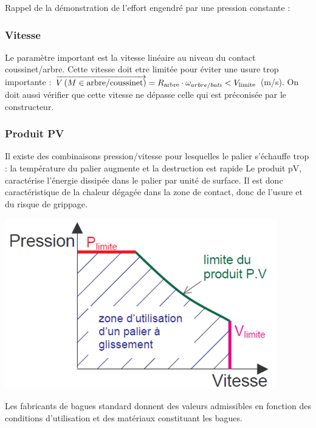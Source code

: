 \documentclass[11pt,oneside]{article}
\begin{document}
\begin{exemple}
Rappel de la démonstration de l'effort engendré par une pression constante :

\end{exemple}
\subsubsection{Vitesse}

Le paramètre important est la vitesse linéaire au niveau du contact coussinet/arbre. Cette vitesse doit etre limitée pour éviter une usure trop importante : $\overrightarrow{V\left( {M} \in {\text{arbre}}/{\text{coussinet}}\right)}  =R_{\text{arbre}}\cdot  \omega_{arbre/bati}<V_{\text{limite}}$ (m/s).
On doit aussi vérifier que cette vitesse ne dépasse celle qui est préconisée par le constructeur.

\subsubsection{Produit PV}
\noindent\begin{minipage}[c]{.45\linewidth}
Il existe des combinaisons pression/vitesse pour lesquelles le palier s'échauffe trop : la température du palier augmente et la destruction est rapide
Le produit pV, caractérise l'énergie dissipée dans le palier par unité de surface. 
Il est donc caractéristique de la chaleur dégagée dans la zone de contact, donc de l'usure et du risque de grippage. 
\end{minipage}\hfill
\begin{minipage}[c]{.45\linewidth}

\begin{center}
\includegraphics[width=.9\textwidth]{png/fig22}
\end{center}
\end{minipage}
Les fabricants de bagues standard donnent des valeurs  admissibles en fonction des conditions d'utilisation et des matériaux constituant les bagues.
\end{document}
